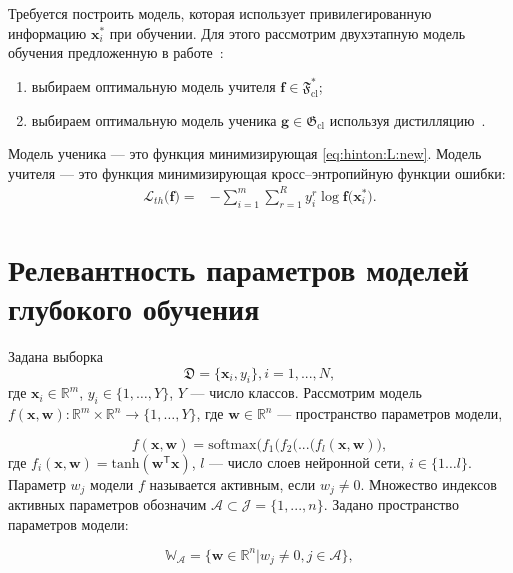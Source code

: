 Требуется построить модель, которая использует привилегированную информацию $\mathbf{x}^*_i$ при обучении. Для этого рассмотрим двухэтапную модель обучения предложенную в работе~\cite{Lopez2016}:
\begin{enumerate}
    \item выбираем оптимальную модель учителя $\mathbf{f} \in \mathfrak{F}_{\text{cl}}^*$;
    \item выбираем оптимальную модель ученика $\mathbf{g} \in \mathfrak{G}_{\text{cl}}$ используя дистилляцию~\cite{Hinton2015}. 
\end{enumerate}

Модель ученика --- это функция минимизирующая \eqref{eq:hinton:L:new}. Модель учителя --- это функция минимизирующая кросс--энтропийную функции ошибки:
\[
\label{eq:hinton.2}
\begin{aligned}
   \mathcal{L}_{th}\bigr(\mathbf{f}\bigr) = &-\sum_{i=1}^{m}{{\sum_{r=1}^{R}y^r_i\log\mathbf{f}\bigr(\mathbf{x}^*_i\bigr)}}.
   \end{aligned}
\]

\section{Релевантность параметров моделей глубокого обучения}

Задана выборка
\[
\label{2.1}
\mathfrak{D} = \{\textbf{x}_i,y_i\},  i =1,...,N,
\]
где $\textbf{x}_i \in \mathbb{R}^{m}$, $y_i \in \{1, \dots, Y\}$, $Y$ --- число классов.
Рассмотрим модель $f(\mathbf{x}, \mathbf{w}): \mathbb{R}^m \times \mathbb{R}^n \to \{1,\dots,Y\}$, где $\textbf{w} \in \mathbb{R}^n$ --- пространство параметров модели,

\[
\label{2.2}
f(\mathbf{x}, \mathbf{w}) = \text{softmax}\bigl( f_1(f_2(...(f_l(\mathbf{x}, \mathbf{w})\bigr),
\]
где $f_i(\mathbf{x}, \mathbf{w}) =  \text{tanh}(\mathbf{w}^\mathsf{T}\mathbf{x})$, $l$ --- число слоев нейронной сети, $i \in \{1\dots l\}$.
Параметр $w_j$ модели $f$  называется активным, если $w_j \not = 0$. Множество индексов активных параметров обозначим $\mathcal{A} \subset \mathcal{J} = \{1,...,n\}$.
Задано пространство параметров модели:

\[
\label{2.3}
\mathbb{W_\mathcal{A}} = \{ \textbf{w} \in \mathbb{R}^n | w_j\not=0, j \in \mathcal{A}  \},
\]


